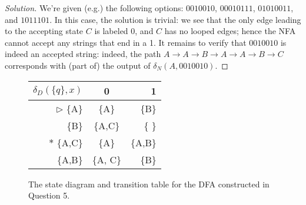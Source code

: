 \begin{proof}[Solution]
We're given (e.g.) the following options: $0010010$, $00010111$, $01010011$, and $1011101$. In this case, the solution is trivial: we see that the only edge leading to the accepting state $C$ is labeled 0, and $C$ has no looped edges; hence the NFA cannot accept any strings that end in a 1. It remains to verify that $0010010$ is indeed an accepted string: indeed, the path $A \to A \to B \to A \to A \to B \to C$ corresponds with (part of) the output of $\delta_N(A, 0010010)$.
\end{proof}

\begin{figure}[ht]
\centering
\setlength\tabcolsep{10pt}
\begin{minipage}{0.48\textwidth}
\centering
{}
\end{minipage}
\begin{minipage}{0.48\textwidth}
\centering
\begin{tabular}{r|c|r}
$\delta_D(\{q\},x)$ & 0 & 1 \\
\hline
$\rhd$ \{A\} & \{A\} & \{B\} \\
       \{B\} & \{A,C\} & \{ \} \\
$\ast$ \{A,C\} & \{A\} & \{A,B\} \\
       \{A,B\} & \{A, C\} &\{B\}\\
\end{tabular}
\end{minipage}
\caption{}The state diagram and transition table for the DFA constructed in Question 5.
\end{figure}
